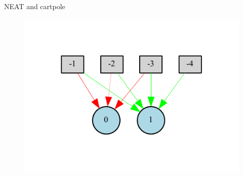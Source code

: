 \documentclass{beamer}
\begin{document}
\begin{frame}{NEAT and cartpole}
    \begin{figure}[c]
        \includegraphics[width=\textwidth]{pdf/neat_pole_balancing_winner.pdf}
    \end{figure}
\end{frame}
\end{document}
